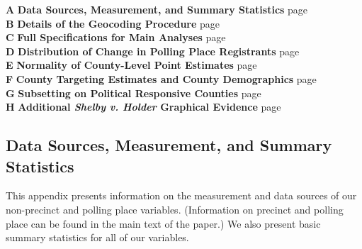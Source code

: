 \documentclass[12pt]{article}
\begin{document}
\vspace{.1in}
\noindent \textbf{A} 		\hspace*{.191in} \textbf{Data Sources, Measurement, and Summary Statistics  } \dotfill page~\pageref{appendix_datasources}\\
\textbf{B} 		\hspace*{.2in} \textbf{Details of the Geocoding Procedure  } \dotfill page~\pageref{appendix_geocoding}\\
\textbf{C} 		\hspace*{.205in} \textbf{Full Specifications for Main Analyses} 		\dotfill page~\pageref{appendix_maintargeting} \\
\textbf{D} 		\hspace*{.197in} \textbf{Distribution of Change in Polling Place Registrants} 			\dotfill page~\pageref{appendix_change_voters_per_pp} \\
\textbf{E} 		\hspace*{.214in} \textbf{Normality of County-Level Point Estimates } 	\dotfill page~\pageref{appendix_county_point_estimate_distributions} \\
\textbf{F} 		\hspace*{.21in} \textbf{County Targeting Estimates and County Demographics } 	\dotfill page~\pageref{appendix_countytargetinganddemographics} \\
\textbf{G} 		\hspace*{.18in} \textbf{Subsetting on Political Responsive Counties} 	\dotfill page~\pageref{appendix_politically_responsive_counties} \\
\textbf{H} \hspace*{.18in} \textbf{Additional \emph{Shelby v. Holder} Graphical Evidence } 	\dotfill page~\pageref{appendix_shelby} \\




\clearpage \newpage
\subsection{Data Sources, Measurement, and Summary Statistics}\label{appendix_datasources}
\setcounter{table}{0}
\setcounter{figure}{0}
\renewcommand{\thetable}{A\arabic{table}}
\renewcommand{\thefigure}{A\arabic{figure}}


This appendix presents information on the measurement and data sources of our non-precinct and polling place variables.  (Information on precinct and polling place can be found in the main text of the paper.)  We also present basic summary statistics for all of our variables.
\end{document}
